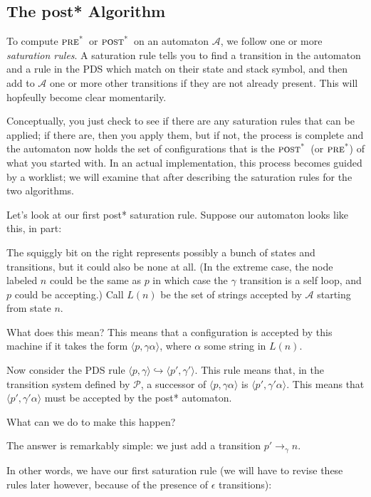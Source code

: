 \documentclass{article}
\newcommand{\Config}[2]{\ensuremath{\langle #1, #2 \rangle}}
\newcommand{\Rule}[2]{\ensuremath{#1 \hookrightarrow #2}}
\newcommand{\Trans}[3]{\ensuremath{#1 \rightarrow_{#2} #3}}
\newcommand{\poststar}{\ensuremath{\textsc{post}^\textsc{*}}}
\newcommand{\prestar}{\ensuremath{\textsc{pre}^\textsc{*}}}
\begin{document}
\subsection{The post* Algorithm}

To compute \prestar\ or \poststar\ on an automaton $\mathcal{A}$, we
follow one or more \emph{saturation rules}. A saturation rule tells
you to find a transition in the automaton and a rule in the PDS which
match on their state and stack symbol, and then add to $\mathcal{A}$
one or more other transitions if they are not already present. This
will hopfeully become clear momentarily.

Conceptually, you just check to see if there are any saturation rules
that can be applied; if there are, then you apply them, but if not,
the process is complete and the automaton now holds the set of
configurations that is the \poststar\ (or \prestar) of what you
started with. In an actual implementation, this process becomes guided
by a worklist; we will examine that after describing the saturation
rules for the two algorithms.


Let's look at our first post* saturation rule. Suppose our automaton
looks like this, in part:



The squiggly bit on the right represents possibly a bunch of states
and transitions, but it could also be none at all. (In the extreme
case, the node labeled $n$ could be the same as $p$ in which case the
$\gamma$ transition is a self loop, and $p$ could be accepting.) Call
$L(n)$ be the set of strings accepted by $\mathcal{A}$ starting from
state $n$.

What does this mean? This means that a configuration is accepted by
this machine if it takes the form \Config{p}{\gamma\alpha}, where
$\alpha$ some string in $L(n)$.

Now consider the PDS rule
\Rule{\Config{p}{\gamma}}{\Config{p'}{\gamma'}}. This rule means that,
in the transition system defined by $\mathcal{P}$, a successor of
\Config{p}{\gamma\alpha} is \Config{p'}{\gamma'\alpha}. This means
that \Config{p'}{\gamma'\alpha} must be accepted by the post*
automaton.

What can we do to make this happen?

The answer is remarkably simple: we just add a transition
$\Trans{p'}{\gamma}{n}$.

In other words, we have our first saturation rule (we will have to
revise these rules later however, because of the presence of
$\epsilon$ transitions):
\end{document}
